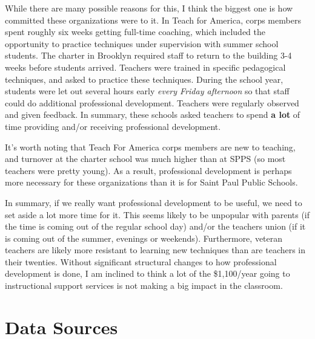 \documentclass[
]{article}
\begin{document}
While there are many possible reasons for this, I think the biggest one
is how committed these organizations were to it. In Teach for America,
corps members spent roughly six weeks getting full-time coaching, which
included the opportunity to practice techniques under supervision with
summer school students. The charter in Brooklyn required staff to return
to the building 3-4 weeks before students arrived. Teachers were trained
in specific pedagogical techniques, and asked to practice these
techniques. During the school year, students were let out several hours
early \emph{every Friday afternoon} so that staff could do additional
professional development. Teachers were regularly observed and given
feedback. In summary, these schools asked teachers to spend \textbf{a
lot} of time providing and/or receiving professional development.

It's worth noting that Teach For America corps members are new to
teaching, and turnover at the charter school was much higher than at
SPPS (so most teachers were pretty young). As a result, professional
development is perhaps more necessary for these organizations than it is
for Saint Paul Public Schools.

In summary, if we really want professional development to be useful, we
need to set aside a lot more time for it. This seems likely to be
unpopular with parents (if the time is coming out of the regular school
day) and/or the teachers union (if it is coming out of the summer,
evenings or weekends). Furthermore, veteran teachers are likely more
resistant to learning new techniques than are teachers in their
twenties. Without significant structural changes to how professional
development is done, I am inclined to think a lot of the \$1,100/year
going to instructional support services is not making a big impact in
the classroom.

\section{Data Sources}\label{data-sources}
\end{document}
